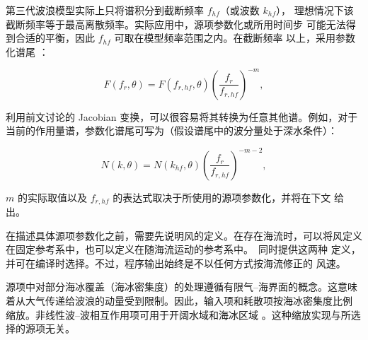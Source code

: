 
第三代波浪模型实际上只将谱积分到截断频率 $f_{hf}$（或波数 $k_{hf}$），
理想情况下该截断频率等于最高离散频率。实际应用中，源项参数化或所用时间步
可能无法得到合适的平衡，因此 $f_{hf}$ 可取在模型频率范围之内。在截断频率
以上，采用参数化谱尾 \citep[例如][]{art:WAM88}：


\begin{equation}
F(f_r,\theta) = F(f_{r,hf},\theta) \left ( \frac{f_r}{f_{r,hf}}
\right ) ^{-m} \label{eq:tail_E_f} ,
\end{equation}

\noindent
利用前文讨论的 Jacobian 变换，可以很容易将其转换为任意其他谱。例如，对于
当前的作用量谱，参数化谱尾可写为（假设谱尾中的波分量处于深水条件）：


\begin{equation}
N(k,\theta) = N(k_{hf},\theta) \left ( \frac{f_r}{f_{r,hf}}
\right ) ^{-m-2} \label{eq:tail_N_k} ,
\end{equation}

\noindent
$m$ 的实际取值以及 $f_{r,hf}$ 的表达式取决于所使用的源项参数化，并将在下文
给出。

在描述具体源项参数化之前，需要先说明风的定义。在存在海流时，可以将风定义
在固定参考系中，也可以定义在随海流运动的参考系中。\ws\ 同时提供这两种
定义，并可在编译时选择。不过，程序输出始终是不以任何方式按海流修正的
风速。

源项中对部分海冰覆盖（海冰密集度）的处理遵循有限气--海界面的概念。这意味
着从大气传递给波浪的动量受到限制。因此，输入项和耗散项按海冰密集度比例
缩放。非线性波--波相互作用项可用于开阔水域和海冰区域
\citep{art:PL07}。这种缩放实现与所选择的源项无关。
